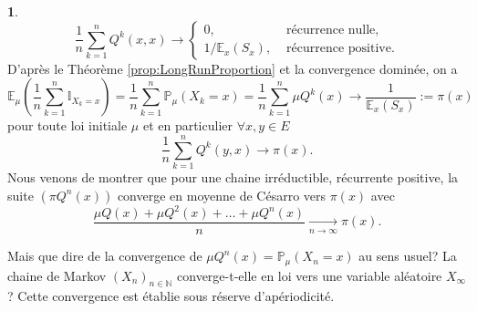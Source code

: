 \documentclass[8pt,notheorems]{beamer}
\def \E{\mathbb E}
\def \N{\mathbb N}
\renewcommand{\Pr}{\mathbb{P}}
\theoremstyle{definition}
\theoremstyle{example}
\newtheorem{remark}{\translate{Remarque}}
\theoremstyle{mystyle}
\theoremstyle{plain}
\begin{document}
\begin{frame}[allowframebreaks]
\begin{remark}
$$
\frac{1}{n}\sum_{k=1}^{n}Q^{k}(x,x)\rightarrow
\begin{cases}
0, & \text{ récurrence nulle},\\
1/\E_x(S_x), & \text{ récurrence positive}.
\end{cases}
$$
D'après le Théorème \ref{prop:LongRunProportion} et la convergence dominée, on a
$$
\E_{\mu}\left(\frac{1}{n}\sum_{k=1}^{n}\mathbb{I}_{X_k=x}\right)=\frac{1}{n}\sum_{k=1}^{n}\Pr_{\mu}(X_k=x)=\frac{1}{n}\sum_{k=1}^{n}\mu Q^{k}(x)\rightarrow \frac{1}{\E_{x}(S_x)}:=\pi(x)
$$
pour toute loi initiale $\mu$ et en particulier $\forall x,y\in E$
$$
\frac{1}{n}\sum_{k=1}^{n}Q^{k}(y,x)\rightarrow \pi(x).
$$
Nous venons de montrer que pour une chaine irréductible, récurrente positive, la suite $(\pi Q^{n}(x))$ converge en moyenne de Césarro vers $\pi(x)$ avec
$$
\frac{\mu Q(x)+\mu Q^{2}(x)+\ldots+\mu Q^{n}(x)}{n}\underset{n\rightarrow\infty}{\rightarrow}\pi(x).
$$
\end{remark}
Mais que dire de la convergence de $\mu Q^{n}(x)=\mathbb{P}_{\mu}(X_n=x)$ au sens usuel? La chaine de Markov $(X_n)_{n\in\N}$ converge-t-elle en loi vers une variable aléatoire $X_{\infty}$? Cette convergence est établie sous réserve d'apériodicité.

\end{frame}
\end{document}
